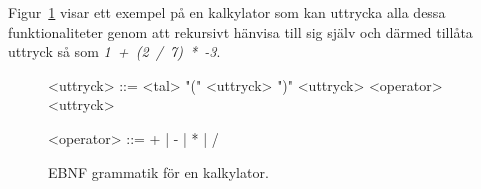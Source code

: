 Figur~\ref{fig:cfg} visar ett exempel på en kalkylator som kan uttrycka alla
dessa funktionaliteter genom att rekursivt hänvisa till sig själv och därmed
tillåta uttryck så som \mbox{\textit{1 + (2 / 7) * -3}}.

\begin{figure}[ht]
  \begin{grammar}
    \singlespace\small%
    \selectfont

    <uttryck> ::= <tal>
      \alt "(" <uttryck> ")"
      \alt <uttryck> <operator> <uttryck>

    <operator> ::= + | - | * | /

  \end{grammar}
  \caption{EBNF grammatik för en kalkylator.}
  \label{fig:cfg}
\end{figure}

